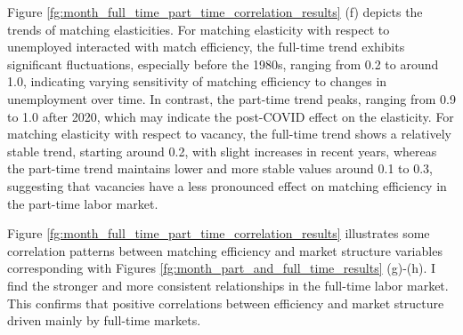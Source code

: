 \documentclass[12pt]{article}
\begin{document}
Figure \ref{fg:month_full_time_part_time_correlation_results} (f) depicts the trends of matching elasticities.
For matching elasticity with respect to unemployed interacted with match efficiency, the full-time trend exhibits significant fluctuations, especially before the 1980s, ranging from 0.2 to around 1.0, indicating varying sensitivity of matching efficiency to changes in unemployment over time. 
In contrast, the part-time trend peaks, ranging from 0.9 to 1.0 after 2020, which may indicate the post-COVID effect on the elasticity.
For matching elasticity with respect to vacancy, the full-time trend shows a relatively stable trend, starting around 0.2, with slight increases in recent years, whereas the part-time trend maintains lower and more stable values around 0.1 to 0.3, suggesting that vacancies have a less pronounced effect on matching efficiency in the part-time labor market.

Figure \ref{fg:month_full_time_part_time_correlation_results} illustrates some correlation patterns between matching efficiency and market structure variables corresponding with Figures \ref{fg:month_part_and_full_time_results} (g)-(h).
I find the stronger and more consistent relationships in the full-time labor market.
This confirms that positive correlations between efficiency and market structure driven mainly by full-time markets.
\end{document}
